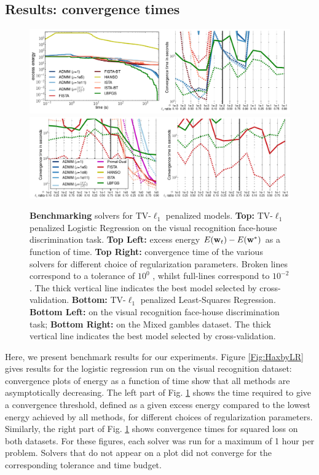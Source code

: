 \subsection{Results: convergence times}
 \begin{figure}[!htbp]
   \includegraphics[width=1\linewidth]{figures/solvers_1.png}
   \includegraphics[width=1\linewidth]{figures/solvers_2.png}
   \caption{\textbf{Benchmarking } solvers for TV-$\ell_1$ penalized models. \textbf{Top:} TV-$\ell_1$ penalized Logistic Regression on the visual recognition face-house discrimination task. \textbf{Top Left:} excess energy $E(\mathbf{w}_t ) - E(\mathbf{w}^*)$ as a function of time. \textbf{Top Right:} convergence time of the various solvers for different choice of regularization parameters. Broken lines correspond to a tolerance of
     $10^0$ , whilst full-lines correspond to $10^{-2}$ . The thick vertical line indicates the best model selected by cross-validation. \textbf{Bottom:} TV-$\ell_1$ penalized Least-Squares Regression. \textbf{Bottom Left:} on the visual recognition face-house discrimination task; \textbf{Bottom Right:} on the Mixed gambles dataset. The thick vertical line indicates the best model selected by cross-validation.}
   \label{fig:tvl1bench}
\end{figure}

\label{sec:results}
Here, we present benchmark results for our experiments. Figure
\ref{Fig:HaxbyLR} gives results for the logistic regression run on the
visual recognition dataset: convergence plots of energy as a function of
time show that all methods are asymptotically decreasing. The left part of
Fig. \ref{fig:tvl1bench}
shows the time required to give a convergence
threshold, defined as a given excess energy compared to the lowest energy
achieved by all methods, for different choices of regularization
parameters. Similarly, the right part of Fig. \ref{fig:tvl1bench} shows convergence times
for squared loss on both datasets. For these figures,
each solver was run for a maximum of 1 hour per problem. Solvers that do
not appear on a plot did not converge for the corresponding
tolerance and time budget.

